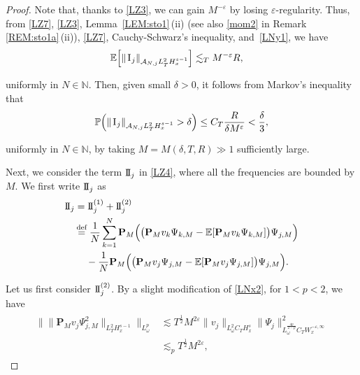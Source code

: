\documentclass[letterpaper, 11pt,  reqno]{amsart}
\newcommand{\1}{\hspace{0.5mm}\text{I}\hspace{0.2mm}}
\newcommand{\II}{\text{I \hspace{-2.8mm} I} }
\newcommand{\noi}{\noindent}
\newcommand{\N}{\mathbb{N}}
\newcommand{\E}{\mathbb{E}}
\newcommand{\PP}{\mathbb{P}}
\newcommand{\eps}{\varepsilon}
\newcommand{\dl}{\delta}
\newcommand{\les}{\lesssim}
\renewcommand{\P}{\mathbf{P}}
\newcommand{\A}{\mathcal{A}}
\newcommand{\deff}{\stackrel{\textup{def}}{=}}
\renewcommand{\o}{\omega}
\numberwithin{equation}{section}
\numberwithin{theorem}{section}
\begin{document}
\begin{proof}
\noi
Note that, thanks to \eqref{LZ3}, we can gain $M^{-\eps}$
by losing $\eps$-regularity.
Thus, from 
\eqref{LZ7}, \eqref{LZ3}, 
 Lemma~\ref{LEM:sto1}\,(ii)
(see also \eqref{mom2} in Remark \ref{REM:sto1a}\,(ii)), 
 \eqref{LZ7},
Cauchy-Schwarz's inequality, 
and~\eqref{LNy1}, 
we have
\begin{align*}
\E \Big[
\|\1_j \|_{\A_{N, j}L^2_T H^{s-1}_x}\Big]
& \les_T M^{-\eps} 
R, 
\end{align*}

\noi
uniformly in $N \in \N$.
Then, given small $\dl > 0$, 
it follows from Markov's inequality
that 
\begin{align}
\PP\Big(\|\1_j \|_{\A_{N, j}L^2_T H^{s-1}_x}
> \dl \Big)
\le
C_T \frac{ 
R}
{\dl M^{\eps} }
< \frac \dl 3,  
\label{LZ9}
\end{align}

\noi
uniformly in $N \in \N$, 
by taking 
$M = M(\dl, 
T, 
R)\gg1 $
sufficiently large.











Next, we consider the term $\II_j$ in \eqref{LZ4}, 
where all the frequencies are bounded by $M$.
We first write $\II_j$ as 
\begin{align}
\begin{split}
\II_j & = \II^{(1)}_j + \II^{(2)}_j\\
& \hspace{-0.3mm} \deff \frac 1N \sum_{k = 1}^N 
\P_M \Big(
\big( \P_M v_k \Psi_{k, M}  - \E [\P_M v_k\Psi_{k, M} ] \big) \Psi_{j, M}\Big)\\
& \quad \, - 
\frac 1N
\P_M \Big(
\big( \P_M v_j \Psi_{j, M}  - \E [\P_M v_j\Psi_{j, M} ] \big) \Psi_{j, M}\Big).
\end{split}
\label{LZZ1a}
\end{align}



Let us first consider $\II^{(2)}_j$.
By a slight modification of \eqref{LNx2}, 
for $1 < p < 2$, we have 
\begin{align}
\begin{split}
\Big\| \| \P_M v_j \Psi_{j, M}^2 \|_{L_T^2 H_x^{s-1}} \Big\|_{L^p_\o}
&\les T^\frac 12  M^{2\eps}\| v_j \|_{L^2_\o C_T  H_x^{s}}
 \|\Psi_j \|^2_{L^\frac{4p}{2-p}_\o C_T  W_x^{- \eps, \infty}}\\
 & \les_p 
  T^\frac 12 M^{2\eps}, 
\end{split}
\label{LZZ1b}
\end{align}



\end{proof}
\end{document}
